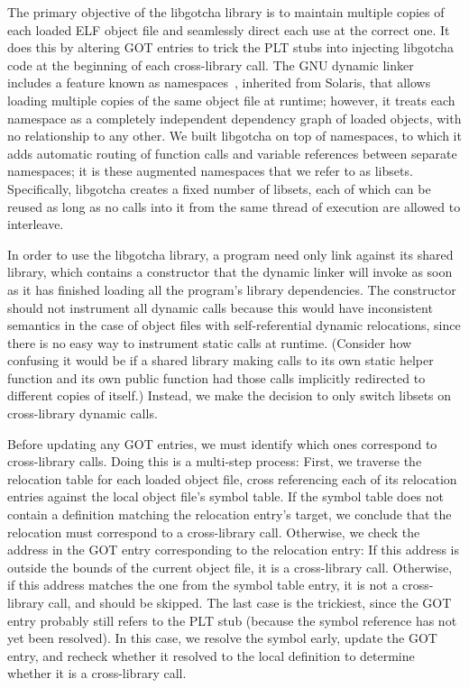 The primary objective of the libgotcha library is to maintain multiple copies of each
loaded ELF object file and seamlessly direct each use at the correct one.  It does
this by altering GOT entries to trick the PLT stubs into injecting libgotcha code at
the beginning of each cross-library call.  The GNU
dynamic linker includes a feature known as namespaces~\cite{dlmopen-manpage},
inherited from Solaris, that allows loading multiple copies of the same object file
at runtime; however, it treats each namespace as a completely independent dependency
graph of loaded objects, with no relationship to any other.  We built
libgotcha on top of namespaces, to which it adds automatic routing of function calls
and variable references between separate namespaces; it is these augmented
namespaces that we refer to as libsets.  Specifically, libgotcha creates a fixed
number of
libsets, each of which can be reused as long as no calls into it from the same thread
of execution are allowed to interleave.

In order to use the libgotcha library, a program need only link against its shared
library, which contains a constructor that the dynamic linker will invoke as soon as
it has finished loading all the program's library dependencies.  The constructor
should not instrument all dynamic calls because this would
have inconsistent semantics in the case of object files with self-referential dynamic
relocations, since there is no easy way to instrument static calls at runtime.
(Consider how confusing it would be if a shared library making calls to its own
static helper function and its own public function had those calls implicitly
redirected to different
copies of itself.)  Instead, we make the decision to only switch libsets on
cross-library dynamic calls.

Before updating any GOT entries, we must identify
which ones correspond to cross-library calls.  Doing this is a multi-step process:
First, we traverse the relocation table for each loaded object file, cross
referencing each of its relocation entries against the local object file's symbol
table.  If the symbol table does not contain a definition matching the relocation
entry's target, we conclude that the relocation must correspond to a cross-library
call.  Otherwise, we check the address in the GOT entry corresponding to the
relocation entry:  If this address is outside the bounds of the current object file,
it is a cross-library call.  Otherwise, if this address matches the one from the
symbol table entry, it is not a cross-library call, and should be skipped.  The last
case is the trickiest, since the GOT entry probably still refers to the PLT stub
(because the symbol reference has not yet been resolved).  In this case, we resolve
the symbol
early, update the GOT entry, and recheck whether it resolved to the local definition
to determine whether it is a cross-library call.

